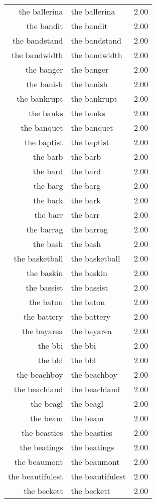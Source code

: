\begin{table}[ht]
\begin{tabular}{rlr}
  the ballerina & the ballerina & 2.00 \\ 
  the bandit & the bandit & 2.00 \\ 
  the bandstand & the bandstand & 2.00 \\ 
  the bandwidth & the bandwidth & 2.00 \\ 
  the banger & the banger & 2.00 \\ 
  the banish & the banish & 2.00 \\ 
  the bankrupt & the bankrupt & 2.00 \\ 
  the banks & the banks & 2.00 \\ 
  the banquet & the banquet & 2.00 \\ 
  the baptist & the baptist & 2.00 \\ 
  the barb & the barb & 2.00 \\ 
  the bard & the bard & 2.00 \\ 
  the barg & the barg & 2.00 \\ 
  the bark & the bark & 2.00 \\ 
  the barr & the barr & 2.00 \\ 
  the barrag & the barrag & 2.00 \\ 
  the bash & the bash & 2.00 \\ 
  the basketball & the basketball & 2.00 \\ 
  the baskin & the baskin & 2.00 \\ 
  the bassist & the bassist & 2.00 \\ 
  the baton & the baton & 2.00 \\ 
  the battery & the battery & 2.00 \\ 
  the bayarea & the bayarea & 2.00 \\ 
  the bbi & the bbi & 2.00 \\ 
  the bbl & the bbl & 2.00 \\ 
  the beachboy & the beachboy & 2.00 \\ 
  the beachland & the beachland & 2.00 \\ 
  the beagl & the beagl & 2.00 \\ 
  the beam & the beam & 2.00 \\ 
  the beasties & the beasties & 2.00 \\ 
  the beatings & the beatings & 2.00 \\ 
  the beaumont & the beaumont & 2.00 \\ 
  the beautifulest & the beautifulest & 2.00 \\ 
  the beckett & the beckett & 2.00 \\ 

\end{tabular}
\end{table}
